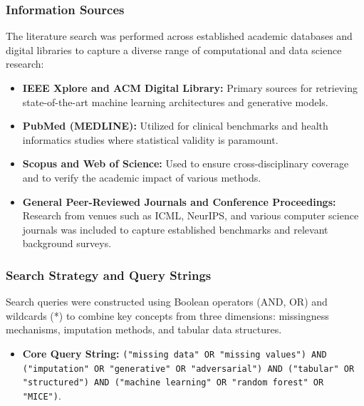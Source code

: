 \documentclass[twocolumn, 9pt]{extarticle}
\begin{document}
\subsubsection{Information Sources}
The literature search was performed across established academic databases and digital libraries to capture a diverse range of computational and data science research:
\begin{itemize}
    \item \textbf{IEEE Xplore and ACM Digital Library:} Primary sources for retrieving state-of-the-art machine learning architectures and generative models.
    \item \textbf{PubMed (MEDLINE):} Utilized for clinical benchmarks and health informatics studies where statistical validity is paramount.
    \item \textbf{Scopus and Web of Science:} Used to ensure cross-disciplinary coverage and to verify the academic impact of various methods.
    \item \textbf{General Peer-Reviewed Journals and Conference Proceedings:} Research from venues such as ICML, NeurIPS, and various computer science journals was included to capture established benchmarks and relevant background surveys.
\end{itemize}

\subsubsection{Search Strategy and Query Strings}
Search queries were constructed using Boolean operators (AND, OR) and wildcards (*) to combine key concepts from three dimensions: missingness mechanisms, imputation methods, and tabular data structures.
\begin{itemize}
    \item \textbf{Core Query String:} \texttt{("missing data" OR "missing values") AND ("imputation" OR "generative" OR "adversarial") AND ("tabular" OR "structured") AND ("machine learning" OR "random forest" OR "MICE")}.
\end{itemize}
\end{document}
